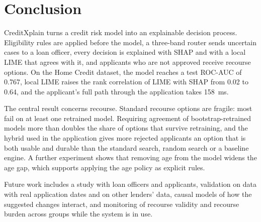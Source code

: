 \section{Conclusion}
\label{sec:conclusion}
CreditXplain turns a credit risk model into an explainable decision process. Eligibility rules are applied before the
model, a three-band router sends uncertain cases to a loan officer, every decision is explained with SHAP and with a
local LIME that agrees with it, and applicants who are not approved receive recourse options. On the Home Credit
dataset, the model reaches a test ROC-AUC of 0.767, local LIME raises the rank correlation of LIME with SHAP from 0.02
to 0.64, and the applicant's full path through the application takes 158~ms.

The central result concerns recourse. Standard recourse options are fragile: most fail on at least one retrained
model. Requiring agreement of bootstrap-retrained models more than doubles the share of options that survive retraining,
and the hybrid used in the application gives more rejected applicants an option that is both usable and durable than
the standard search, random search or a baseline engine. A further experiment shows that removing age from the
model widens the age gap, which supports applying the age policy as explicit rules.

Future work includes a study with loan officers and applicants, validation on data with real application dates and on
other lenders' data, causal models of how the suggested changes interact, and monitoring of recourse validity and
recourse burden across groups while the system is in use.

